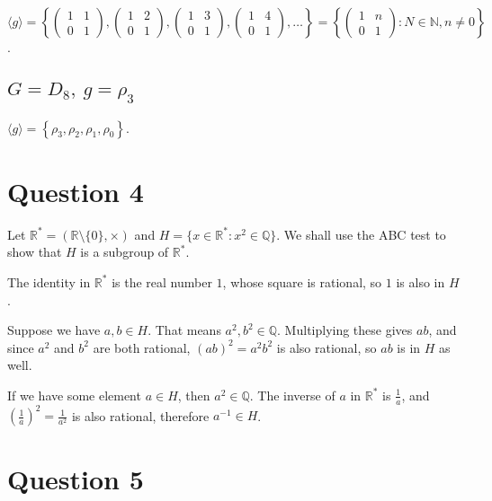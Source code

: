 \documentclass[a4paper]{article}
\begin{document}
$\langle g \rangle = \left\{ \begin{pmatrix}1 & 1\\ 0 & 1\end{pmatrix}, \begin{pmatrix}1 & 2\\ 0 & 1\end{pmatrix}, \begin{pmatrix}1 & 3\\ 0 & 1\end{pmatrix}, \begin{pmatrix}1 & 4\\ 0 & 1\end{pmatrix}, \ldots \right\} = \left\{\begin{pmatrix}1 & n\\ 0 & 1\end{pmatrix} : N \in \mathbb N, n \ne 0\right\}$.

\subsection{$G = D_8,\ g = \rho_3$}

$\langle g \rangle = \left\{ \rho_3, \rho_2, \rho_1, \rho_0 \right\}$.


\section*{Question 4}

Let $\mathbb R^* = (\mathbb R \setminus \{0\}, \times)$ and $H = \{x \in \mathbb R^* : x^2 \in \mathbb Q\}$. We shall use the ABC test to show that $H$ is a subgroup of $\mathbb R^*$.

The identity in $\mathbb R^*$ is the real number $1$, whose square is rational, so $1$ is also in $H$.

Suppose we have $a, b \in H$. That means $a^2, b^2 \in \mathbb Q$. Multiplying these gives $ab$, and since $a^2$ and $b^2$ are both rational, $(ab)^2 = a^2 b^2$ is also rational, so $ab$ is in $H$ as well.

If we have some element $a \in H$, then $a^2 \in \mathbb Q$. The inverse of $a$ in $\mathbb R^*$ is $\frac1a$, and $\left(\frac1a\right)^2 = \frac1{a^2}$ is also rational, therefore $a^{-1} \in H$.


\section*{Question 5}
\end{document}
